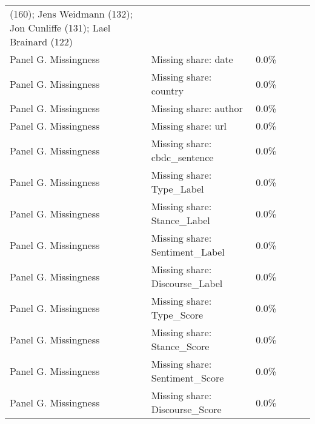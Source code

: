 \begin{longtable}{p{3.2cm}p{7.8cm}p{4.5cm}p{1.6cm}p{1.6cm}p{2.0cm}}
(160); Jens Weidmann (132); Jon Cunliffe (131); Lael Brainard (122) &  &  &  \\
Panel G. Missingness & Missing share: date & 0.0\% &  &  &  \\
Panel G. Missingness & Missing share: country & 0.0\% &  &  &  \\
Panel G. Missingness & Missing share: author & 0.0\% &  &  &  \\
Panel G. Missingness & Missing share: url & 0.0\% &  &  &  \\
Panel G. Missingness & Missing share: cbdc\_sentence & 0.0\% &  &  &  \\
Panel G. Missingness & Missing share: Type\_Label & 0.0\% &  &  &  \\
Panel G. Missingness & Missing share: Stance\_Label & 0.0\% &  &  &  \\
Panel G. Missingness & Missing share: Sentiment\_Label & 0.0\% &  &  &  \\
Panel G. Missingness & Missing share: Discourse\_Label & 0.0\% &  &  &  \\
Panel G. Missingness & Missing share: Type\_Score & 0.0\% &  &  &  \\
Panel G. Missingness & Missing share: Stance\_Score & 0.0\% &  &  &  \\
Panel G. Missingness & Missing share: Sentiment\_Score & 0.0\% &  &  &  \\
Panel G. Missingness & Missing share: Discourse\_Score & 0.0\% &  &  &  \\
\end{longtable}
